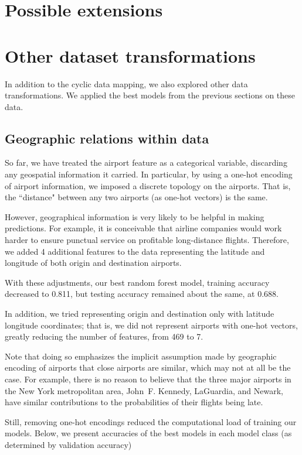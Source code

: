 \documentclass{article}
\begin{document}
\begin{multicols}{2}
\section{Possible extensions}

\section{Other dataset transformations}
\label{sec:dataset}

In addition to the cyclic data mapping,
we also explored other data transformations.
We applied the best models from the previous sections
on these data.

\subsection{Geographic relations within data}

So far, we have treated the airport feature as a categorical variable,
discarding any geospatial information it carried.
In particular,
by using a one-hot encoding of airport information,
we imposed a discrete topology on the airports.
That is, the ``distance" between any two airports
(as one-hot vectors) is the same.

However, geographical information
is very likely to be helpful in making predictions.
For example, it is conceivable that airline companies
would work harder to ensure punctual service
on profitable long-distance flights.
Therefore, we added 4 additional features to the data
representing the latitude and longitude
of both origin and destination airports.

With these adjustments,
our best random forest model,
training accuracy decreased to 0.811,
but testing accuracy remained about the same,
at 0.688.

In addition, we tried representing origin and destination
only with latitude longitude coordinates;
that is, we did not represent airports with one-hot vectors,
greatly reducing the number of features, from 469 to 7.

Note that doing so emphasizes the implicit assumption
made by geographic encoding of airports
that close airports are similar,
which may not at all be the case.
For example, there is no reason to believe
that the three major airports
in the New York metropolitan area,
John~F. Kennedy, LaGuardia, and Newark,
have similar contributions to the probabilities of their flights being late.

Still,
removing one-hot encodings
reduced the computational load of training our models.
Below, we present accuracies of the best models in each model class
(as determined by validation accuracy)


\end{multicols}
\end{document}
